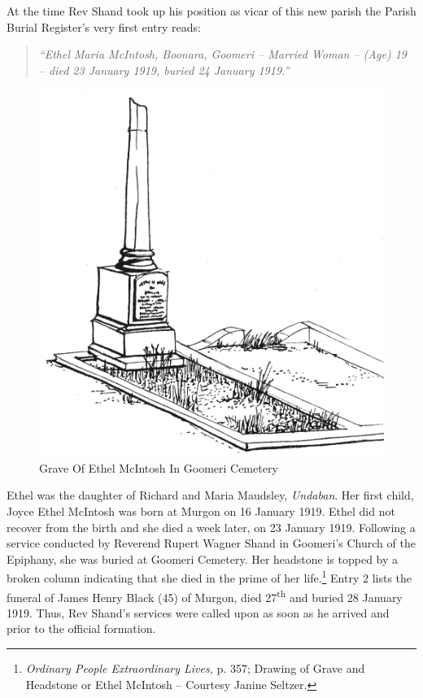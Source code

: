 At the time Rev Shand took up his position as vicar of this new parish the Parish Burial Register's very first entry reads:



\begin{quote}

\emph{``Ethel Maria McIntosh, Boonara, Goomeri -- Married Woman -- (Age) 19 -- died 23 January 1919, buried 24 January 1919.''}

\end{quote}









\begin{figure}
\begin{center}
\includegraphics[width=.7\linewidth,center]{../images/graveOfEthelMcIntoshInGoomeriCemetery.jpg}
\caption{Grave Of Ethel McIntosh In Goomeri Cemetery}
\end{center}
\end{figure}




Ethel was the daughter of Richard and Maria Maudsley, \emph{Undaban}. Her first child, Joyce Ethel McIntosh was born at Murgon on 16 January 1919. Ethel did not recover from the birth and she died a week later, on 23 January 1919. Following a service conducted by Reverend Rupert Wagner Shand in Goomeri's Church of the Epiphany, she was buried at Goomeri Cemetery. Her headstone is topped by a broken column indicating that she died in the prime of her life.\footnote{\emph{Ordinary People Extraordinary Lives,} p. 357; Drawing of Grave and Headstone or Ethel McIntosh -- Courtesy Janine Seltzer.} Entry 2 lists the funeral of James Henry Black (45) of Murgon, died 27\textsuperscript{th} and buried 28 January 1919. Thus, Rev Shand's services were called upon as soon as he arrived and prior to the official formation.


